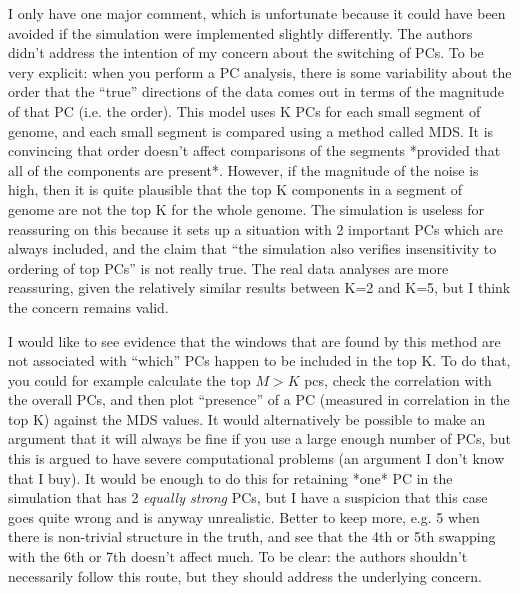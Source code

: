 \begin{point}{}
I only have one major comment, which is unfortunate because it could have been avoided if the simulation were implemented slightly differently. The authors didn't address the intention of my concern about the switching of PCs. To be very explicit: when you perform a PC analysis, there is some variability about the order that the ``true'' directions of the data comes out in terms of the magnitude of that PC (i.e. the order). This model uses K PCs for each small segment of genome, and each small segment is compared using a method called MDS. It is convincing that order doesn't affect comparisons of the segments *provided that all of the components are present*. However, if the magnitude of the noise is high, then it is quite plausible that the top K components in a segment of genome are not the top K for the whole genome. The simulation is useless for reassuring on this because it sets up a situation with 2 important PCs which are always included, and the claim that ``the simulation also verifies insensitivity to ordering of top PCs'' is not really true. The real data analyses are more reassuring, given the relatively similar results between K=2 and K=5, but I think the concern remains valid.

    I would like to see evidence that the windows that are found by this method are not associated with ``which'' PCs happen to be included in the top K. To do that, you could for example calculate the top $M>K$ pcs, check the correlation with the overall PCs, and then plot ``presence'' of a PC (measured in correlation in the top K) against the MDS values. It would alternatively be possible to make an argument that it will always be fine if you use a large enough number of PCs, but this is argued to have severe computational problems (an argument I don't know that I buy). It would be enough to do this for retaining *one* PC in the simulation that has 2 \emph{equally strong} PCs, but I have a suspicion that this case goes quite wrong and is anyway unrealistic. Better to keep more, e.g. 5 when there is non-trivial structure in the truth, and see that the 4th or 5th swapping with the 6th or 7th doesn't affect much. To be clear: the authors shouldn't necessarily follow this route, but they should address the underlying concern.
\end{point}


